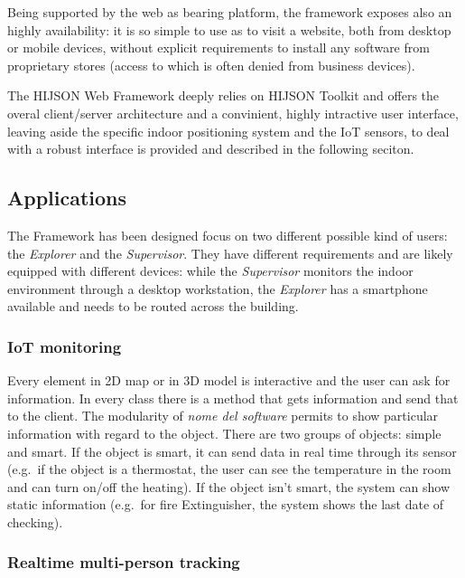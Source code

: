 \documentclass[]{article}
\begin{document}
Being supported by the web as bearing platform, the framework exposes
also an highly availability: it is so simple to use as to visit a
website, both from desktop or mobile devices, without explicit
requirements to install any software from proprietary stores (access to
which is often denied from business devices).

The HIJSON Web Framework deeply relies on HIJSON Toolkit and offers the
overal client/server architecture and a convinient, highly intractive
user interface, leaving aside the specific indoor positioning system and
the IoT sensors, to deal with a robust interface is provided and
described in the following seciton.

\subsection{Applications}\label{applications}

The Framework has been designed focus on two different possible kind of
users: the \emph{Explorer} and the \emph{Supervisor}. They have
different requirements and are likely equipped with different devices:
while the \emph{Supervisor} monitors the indoor environment through a
desktop workstation, the \emph{Explorer} has a smartphone available and
needs to be routed across the building.

\subsubsection{IoT monitoring}\label{iot-monitoring}

Every element in 2D map or in 3D model is interactive and the user can
ask for information. In every class there is a method that gets
information and send that to the client. The modularity of \emph{nome
del software} permits to show particular information with regard to the
object. There are two groups of objects: simple and smart. If the object
is smart, it can send data in real time through its sensor (e.g.~if the
object is a thermostat, the user can see the temperature in the room and
can turn on/off the heating). If the object isn't smart, the system can
show static information (e.g.~for fire Extinguisher, the system shows
the last date of checking).

\subsubsection{Realtime multi-person
tracking}\label{realtime-multi-person-tracking}
\end{document}
